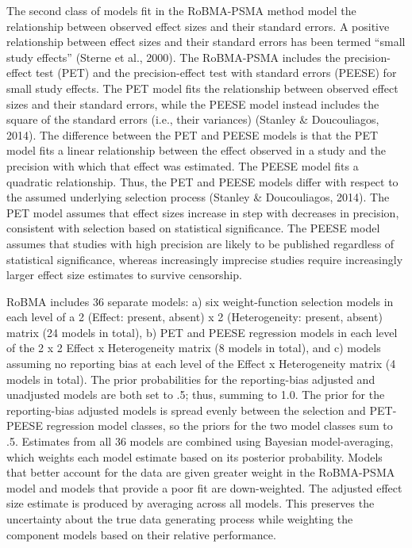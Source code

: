 \documentclass[
  doc, donotrepeattitle,floatsintext]{apa7}
\begin{document}
The second class of models fit in the RoBMA-PSMA method model the relationship between observed effect sizes and their standard errors. A positive relationship between effect sizes and their standard errors has been termed ``small study effects'' (Sterne et al., 2000). The RoBMA-PSMA includes the precision-effect test (PET) and the precision-effect test with standard errors (PEESE) for small study effects. The PET model fits the relationship between observed effect sizes and their standard errors, while the PEESE model instead includes the square of the standard errors (i.e., their variances) (Stanley \& Doucouliagos, 2014). The difference between the PET and PEESE models is that the PET model fits a linear relationship between the effect observed in a study and the precision with which that effect was estimated. The PEESE model fits a quadratic relationship. Thus, the PET and PEESE models differ with respect to the assumed underlying selection process (Stanley \& Doucouliagos, 2014). The PET model assumes that effect sizes increase in step with decreases in precision, consistent with selection based on statistical significance. The PEESE model assumes that studies with high precision are likely to be published regardless of statistical significance, whereas increasingly imprecise studies require increasingly larger effect size estimates to survive censorship.

RoBMA includes 36 separate models: a) six weight-function selection models in each level of a 2 (Effect: present, absent) x 2 (Heterogeneity: present, absent) matrix (24 models in total), b) PET and PEESE regression models in each level of the 2 x 2 Effect x Heterogeneity matrix (8 models in total), and c) models assuming no reporting bias at each level of the Effect x Heterogeneity matrix (4 models in total). The prior probabilities for the reporting-bias adjusted and unadjusted models are both set to .5; thus, summing to 1.0. The prior for the reporting-bias adjusted models is spread evenly between the selection and PET-PEESE regression model classes, so the priors for the two model classes sum to .5. Estimates from all 36 models are combined using Bayesian model-averaging, which weights each model estimate based on its posterior probability. Models that better account for the data are given greater weight in the RoBMA-PSMA model and models that provide a poor fit are down-weighted. The adjusted effect size estimate is produced by averaging across all models. This preserves the uncertainty about the true data generating process while weighting the component models based on their relative performance.
\end{document}
